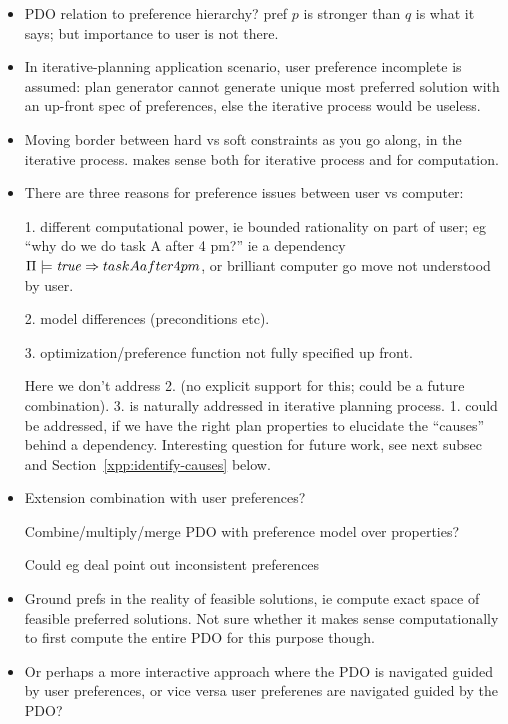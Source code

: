 \begin{itemize}
\item PDO relation to preference hierarchy? pref $p$ is stronger than
  $q$ is what it says; but importance to user is not there.

\item In iterative-planning application scenario, user preference
  incomplete is assumed: plan generator cannot generate unique most
  preferred solution with an up-front spec of preferences, else the
  iterative process would be useless.

\item Moving border between hard vs soft constraints as you go along,
  in the iterative process. makes sense both for iterative process and
  for computation.

\item There are three reasons for preference issues between user vs
  computer:

  1. different computational power, ie bounded rationality on part of
  user; eg ``why do we do task A after 4 pm?'' ie a dependency
  $\Pi \models \mathit{true} \Rightarrow taskAafter4pm$, or brilliant computer go
  move not understood by user.

  2. model differences (preconditions etc).

  3. optimization/preference function not fully specified up front.

  Here we don't address 2. (no explicit support for this; could be a
  future combination). 3. is naturally addressed in iterative planning
  process. 1. could be addressed, if we have the right plan properties
  to elucidate the ``causes'' behind a dependency. Interesting
  question for future work, see next subsec and
  Section~\ref{xpp:identify-causes} below.

\item Extension combination with user preferences?

  Combine/multiply/merge PDO with preference model over properties?

  Could eg deal point out inconsistent preferences

\item Ground prefs in the reality of feasible solutions, ie compute
  exact space of feasible preferred solutions. Not sure whether it
  makes sense computationally to first compute the entire PDO for this
  purpose though.

\item Or perhaps a more interactive approach where the PDO is
  navigated guided by user preferences, or vice versa user preferenes
  are navigated guided by the PDO?

\end{itemize}



